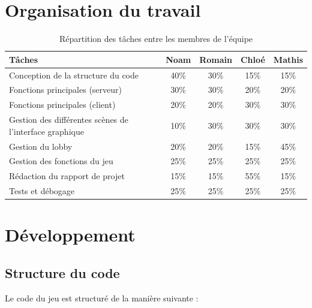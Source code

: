 \documentclass[12pt,a4paper]{article}
\begin{document}
    \section{Organisation du travail}
    \label{sec:organisation}
        \renewcommand{\arraystretch}{1.3}
        \setlength{\tabcolsep}{8pt}
        \begin{table}[h]
        \centering
        \begin{tabularx}{\textwidth}{|>{\raggedright\arraybackslash}X|c|c|c|c|}
        \hline
        \textbf{Tâches} & \textbf{Noam} & \textbf{Romain} & \textbf{Chloé} & \textbf{Mathis} \\
        \hline
        Conception de la structure du code & 40\% & 30\% & 15\% & 15\% \\
        \hline
        Fonctions principales (serveur) & 30\% & 30\% & 20\% & 20\% \\
        \hline
        Fonctions principales (client) & 20\% & 20\% & 30\% & 30\% \\
        \hline
        Gestion des différentes scènes de l'interface graphique & 10\% & 30\% & 30\% & 30\% \\
        \hline
        Gestion du lobby & 20\% & 20\% & 15\% & 45\% \\
        \hline
        Gestion des fonctions du jeu & 25\% & 25\% & 25\% & 25\% \\
        \hline
        Rédaction du rapport de projet & 15\% & 15\% & 55\% & 15\% \\
        \hline
        Tests et débogage & 25\% & 25\% & 25\% & 25\% \\
        \hline
        \end{tabularx}
        \caption{Répartition des tâches entre les membres de l'équipe}
        \end{table}

    \newpage
    \section{Développement}
    \label{sec:developpement}

        \subsection{Structure du code}

        Le code du jeu est structuré de la manière suivante :
\end{document}
